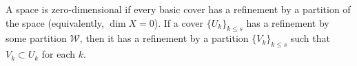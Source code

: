 A space is zero-dimensional if every basic cover has a refinement by a partition of the space (equivalently, $\dim X = 0$). If a cover $\{U_k\}_{k \leq s}$ has a refinement by some partition $\mathcal{W}$, then it has a refinement by a partition $\{V_k\}_{k \leq s}$ such that $V_k \subset U_k$ for each $k$.

